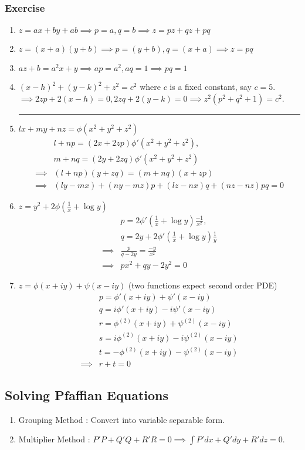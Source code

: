 \subsubsection*{Exercise}
\begin{enumerate}
	\item $z = ax+by+ab \implies p = a, q=b \implies z = pz+qz+pq$
	\item $z = (x+a)(y+b) \implies p = (y+b),q = (x+a) \implies z = pq$
	\item $az+b = a^2x + y \implies ap = a^2,aq=1 \implies pq = 1$
	\item $(x-h)^2 + (y-k)^2 + z^2 = c^2$ where $c$ is a fixed constant, say $c = 5$.\\
		$\implies 2zp + 2(x-h) = 0, 2zq + 2(y-k) = 0 \implies z^2(p^2 + q^2 + 1) = c^2$.
	\hrule
\item $lx+my+nz = \phi(x^2+y^2+z^2)$ 
\begin{align*}
	& l+np = (2x+2zp)\phi'(x^2+y^2+z^2),\\
	& m+nq  = (2y+2zq)\phi'(x^2+y^2+z^2) \\
	\implies & (l+np)(y+zq)  = (m+nq)(x+zp) \\
	\implies & (ly-mx)+(ny-mz)p + (lz-nx)q + (nz-nz)pq = 0
\end{align*}
\item $z = y^2 + 2\phi(\frac{1}{x} + \log y)$ 
\begin{align*}
	& p = 2\phi'(\frac{1}{x}+\log y) \frac{-1}{x^2},\\
	& q = 2y + 2\phi'(\frac{1}{x} + \log y) \frac{1}{y}\\
	\implies & \frac{p}{q-2y} = \frac{-y}{x^2}\\
	\implies & px^2+qy-2y^2 = 0
\end{align*}
\item $z = \phi(x+iy)+\psi(x-iy)$ (two functions expect second order PDE)
\begin{align*}
	& p = \phi'(x+iy) + \psi'(x-iy)\\
	& q = i\phi'(x+iy) -i \psi'(x-iy)\\
	& r = \phi^{(2)}(x+iy) + \psi^{(2)}(x-iy) \\
	& s = i\phi^{(2)}(x+iy) -i \psi^{(2)}(x-iy) \\
	& t = -\phi^{(2)}(x+iy) -\psi^{(2)}(x-iy)\\
	\implies & r+t = 0
\end{align*}
\end{enumerate}

\subsection{Solving Pfaffian Equations}
\begin{enumerate}
	\item Grouping Method : Convert into variable separable form.
	\item Multiplier Method : $P'P+Q'Q+R'R = 0 \implies \int P'dx + Q'dy + R'dz = 0$.
\end{enumerate}

